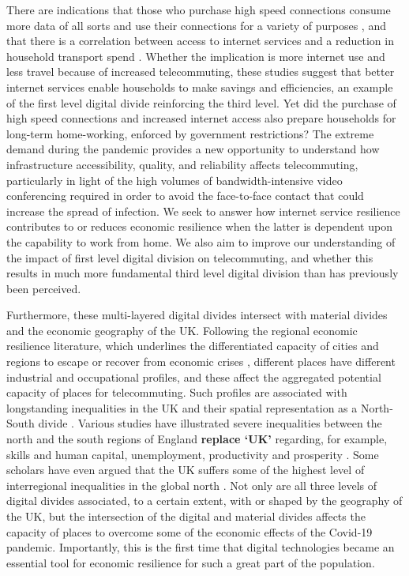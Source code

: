 \documentclass[,]{sagej}
\begin{document}
There are indications that those who purchase high speed connections
consume more data of all sorts and use their connections for a variety
of purposes \citep{hauge2011consumer}, and that there is a correlation
between access to internet services and a reduction in household
transport spend \citep{bris2017ict}. Whether the implication is more
internet use and less travel because of increased telecommuting, these
studies suggest that better internet services enable households to make
savings and efficiencies, an example of the first level digital divide
reinforcing the third level. Yet did the purchase of high speed
connections and increased internet access also prepare households for
long-term home-working, enforced by government restrictions? The extreme
demand during the pandemic provides a new opportunity to understand how
infrastructure accessibility, quality, and reliability affects
telecommuting, particularly in light of the high volumes of
bandwidth-intensive video conferencing required in order to avoid the
face-to-face contact that could increase the spread of infection. We
seek to answer how internet service resilience contributes to or reduces
economic resilience when the latter is dependent upon the capability to
work from home. We also aim to improve our understanding of the impact
of first level digital division on telecommuting, and whether this
results in much more fundamental third level digital division than has
previously been perceived.

Furthermore, these multi-layered digital divides intersect with material
divides and the economic geography of the UK. Following the regional
economic resilience literature, which underlines the differentiated
capacity of cities and regions to escape or recover from economic crises
\citep{martin2012regional, kitsos2018economic}, different places have
different industrial and occupational profiles, and these affect the
aggregated potential capacity of places for telecommuting. Such profiles
are associated with longstanding inequalities in the UK and their
spatial representation as a North-South divide
\citep{martin_north_south}. Various studies have illustrated severe
inequalities between the north and the south regions of England
\textbf{replace `UK'} regarding, for example, skills and human capital,
unemployment, productivity and prosperity
\citep{lee2014grim, mccann2020perceptions, dorling2018peak}. Some
scholars have even argued that the UK suffers some of the highest level
of interregional inequalities in the global north
\citep{gal2018reducing, mccann2016uk}. Not only are all three levels of
digital divides associated, to a certain extent, with or shaped by the
geography of the UK, but the intersection of the digital and material
divides affects the capacity of places to overcome some of the economic
effects of the Covid-19 pandemic. Importantly, this is the first time
that digital technologies became an essential tool for economic
resilience for such a great part of the population.
\end{document}
